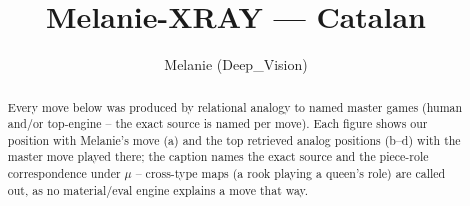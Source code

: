 \documentclass[11pt]{article}
\title{Melanie-XRAY — Catalan}
\author{Melanie (Deep\_Vision)}
\date{}
\begin{document}
\maketitle

\begin{abstract}Every move below was produced by relational analogy to named master games (human and/or top-engine -- the exact source is named per move). Each figure shows our position with Melanie's move (a) and the top retrieved analog positions (b--d) with the master move played there; the caption names the exact source and the piece-role correspondence under $\mu$ -- cross-type maps (a rook playing a queen's role) are called out, as no material/eval engine explains a move that way.\end{abstract}

\begin{figure}[p]\centering
\begin{subfigure}{0.46\textwidth}\centering
\resizebox{\linewidth}{!}{%
\newchessgame
\chessboard[
  setfen={rnbq1rk1/ppp1bppp/4pn2/4N3/2pP4/6P1/PP2PPBP/RNBQ1RK1 b - - 1 7},
  showmover=false,
  pgfstyle=straightmove, color=movearrow, markmove={f6-d5}
]}
\caption{}
\end{subfigure}\hfill
\begin{subfigure}{0.46\textwidth}\centering
\resizebox{\linewidth}{!}{%
\newchessgame
\chessboard[
  setfen={rnbq1rk1/pp2bppp/2p1pn2/4N3/2pP1B2/6P1/PP2PPBP/RN1Q1RK1 b - - 1 9},
  showmover=false,
  pgfstyle=straightmove, color=movearrow, markmove={f6-d5}
]}
\caption{}
\end{subfigure}
\\[4pt]
\begin{subfigure}{0.46\textwidth}\centering
\resizebox{\linewidth}{!}{%
\newchessgame
\chessboard[
  setfen={rnbq1rk1/pp2bppp/2p1pn2/4N3/2pP1B2/6P1/PP2PPBP/RN1Q1RK1 b - - 1 9},
  showmover=false,
  pgfstyle=straightmove, color=movearrow, markmove={f6-d5}
]}
\caption{}
\end{subfigure}\hfill
\begin{subfigure}{0.46\textwidth}\centering
\resizebox{\linewidth}{!}{%
\newchessgame
\chessboard[
  setfen={rnbq1rk1/pp2bppp/2p1pn2/4N3/2pP1B2/6P1/PP2PPBP/RN1Q1RK1 b - - 1 9},
  showmover=false,
  pgfstyle=straightmove, color=movearrow, markmove={f6-d5}
]}
\caption{}
\end{subfigure}

\end{figure}
\end{document}
